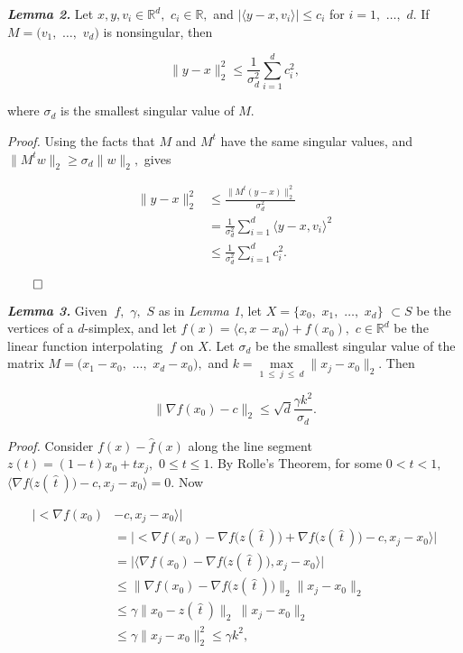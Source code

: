 \documentclass[sigconf]{acmart}
\begin{document}
\noindent \textbf{\textit{Lemma 2.}} Let $x, y, v_i \in \mathbb{R}^d,$ $c_i \in \mathbb{R},$ and $|\langle y - x, v_i \rangle| \leq c_i$ for $i = 1,$ $\ldots,$ $d.$ If $M = (v_1,$ $\ldots,$ $v_d)$ is nonsingular, then

$$\|y - x\|_2^2 \leq \frac{1}{\sigma_d^2} \sum_{i=1}^d c_i^2,$$

where $\sigma_d$ is the smallest singular value of $M.$

\noindent \textit{Proof.} Using the facts that $M$ and $M^t$ have the same singular values, and $\|M^tw\|_2 \geq \sigma_d \|w\|_2,$ gives

\begin{align*}
     \|y - x\|_2^2 &\leq \frac{\|M^t (y - x)\|_2^2}{\sigma_d^2} \\
                   &=    \frac{1}{\sigma_d^2} \sum_{i=1}^d \langle y - x, v_i \rangle^2 \\
                   &\leq \frac{1}{\sigma_d^2} \sum_{i=1}^d c_i^2.
\end{align*}

$\qed$

\noindent \textbf{\textit{Lemma 3.}} Given $\ f,$ $\gamma,$ $S$ as in {\it Lemma 1}, let $X = \{x_0,$ $x_1,$ $\ldots,$ $x_d\}$ $\subset S$ be the vertices of a $d$-simplex, and let $\hat f(x) = \langle c, x - x_0 \rangle + f(x_0),$ $c \in \mathbb{R}^d$ be the linear function interpolating $\ f$ on $X.$ Let $\sigma_d$ be the smallest singular value of the matrix $M = (x_1 - x_0,$ $\ldots,$ $x_d - x_0),$ and $k = \max\limits_{1\ \leq\ j\ \leq\ d} \|x_j - x_0\|_2.$ Then

$$\big\|\nabla f(x_0) - c\big\|_2 \leq \sqrt{d} \frac{\gamma k^2}{\sigma_d}.$$

\noindent \textit{Proof.} Consider $f(x) - \hat f(x)$ along the line segment $z(t) = (1-t)x_0 + t x_j,$ $0 \leq t \leq 1.$ By Rolle's Theorem, for some $0 < \hat t < 1,$ $\big\langle \nabla f\big(z(\ \hat t\ )\big) - c, x_j - x_0 \big\rangle = 0.$ Now

\begin{align*}
       \big| \big< \nabla f(x_0) &- c, x_j - x_0 \big \rangle \big| \\
        &= \big| \big< \nabla f(x_0) - \nabla f\big(z(\ \hat t\ )\big) + \nabla f\big(z(\ \hat t\ )\big) - c, x_j - x_0 \big \rangle \big| \\
	&= \big| \big\langle \nabla f(x_0) - \nabla f \big(z(\ \hat t\ )\big), x_j - x_0 \big \rangle \big| \\
	&\leq \big \| \nabla f(x_0) - \nabla f\big(z(\ \hat t\ )\big) \big \|_2 \|x_j - x_0\|_2 \\
	&\leq \gamma \|x_0 - z(\ \hat t\ )\|_2\ \|x_j - x_0\|_2 \\
	&\leq \gamma \|x_j - x_0\|_2^2 \leq \gamma k^2, \\
\end{align*}
\end{document}

